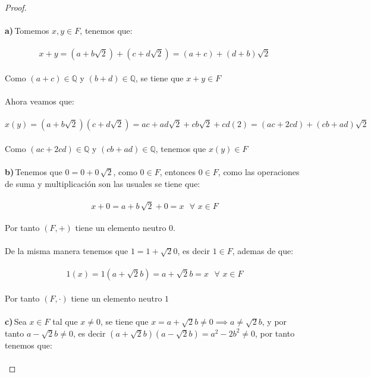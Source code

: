\documentclass[11pt,letterpaper]{article}
\newcommand{\Q}{\mathbb{Q}}
\begin{document}
\begin{proof}\,\\
	\,\\
	\textbf{a)}\,Tomemos $x,y\in F$, tenemos que:\,\\
	\,\\
	\begin{equation*}
		x+y=(a+b\sqrt{2})+(c+d\sqrt{2})=(a+c)+(d+b)\sqrt{2}
	\end{equation*}\,\\
	Como $(a+c)\in \Q$ y $(b+d)\in \Q$, se tiene que $x+y\in F$\,\\
	\,\\
	Ahora veamos que:\,\\
	\,\\
	\begin{equation*}
		x(y)=(a+b\sqrt{2})(c+d\sqrt{2})=ac+ad\sqrt{2}+cb\sqrt{2}+cd(2)=(ac+2cd)+(cb+ad)\sqrt{2}
	\end{equation*}\,\\
	Como $(ac+2cd)\in \Q$ y $(cb+ad)\in \Q$, tenemos que $x(y)\in F$\,\\
	\,\\
	\textbf{b)}\,Tenemos que $0=0+0\,\sqrt{2}$, como $0\in F$, entonces $0\in F$, como las operaciones de suma y multiplicaci\'on son
	las usuales se tiene que:\,\\
	\,\\
	\begin{equation*}
		x+0=a+b\,\sqrt{2}+0=x\,\,\,\,\forall\,\,x\in F
	\end{equation*}\,\\
	Por tanto $(F,+)$ tiene un elemento neutro $0$.\,\\
	\,\\
	De la misma manera tenemos que $1=1+\sqrt{2}0$, es decir $1\in F$, ademas de que:\,\\
	\,\\
	\begin{equation*}
		1(x)=1(a+\sqrt{2}b)=a+\sqrt{2}b=x\,\,\,\,\forall\,\,x\in F
	\end{equation*}\,\\
	Por tanto $(F,\cdot)$ tiene un elemento neutro $1$\,\\
	\,\\
	\textbf{c)}\,Sea $x\in F$ tal que $x\neq 0$, se tiene que $x=a+\sqrt{2}b\neq 0\implies a\neq \sqrt{2}b$, y por tanto
	$a-\sqrt{2}b\neq 0$, es decir $(a+\sqrt{2}b)(a-\sqrt{2}b)=a^2-2b^2\neq 0$, por tanto tenemos que:\,\\
	\,\\

\end{proof}
\end{document}
